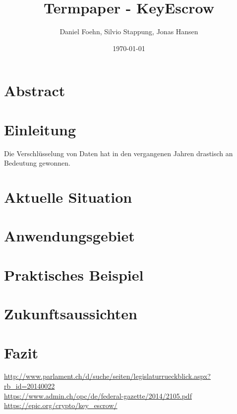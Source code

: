 \documentclass[a4paper, 10pt, fleqn]{article}
\title{Termpaper - KeyEscrow}
\author{Daniel Foehn, Silvio Stappung, Jonas Hansen}
\date{\today} %
\begin{document}
\maketitle
\tableofcontents
\listoffigures
\listoftables
\clearpage
\section{Abstract}

\clearpage
\section{Einleitung}
Die Verschlüsselung von Daten hat in den vergangenen Jahren drastisch an Bedeutung gewonnen. 


\clearpage
\section{Aktuelle Situation}
	

\clearpage
\section{Anwendungsgebiet}
	

\clearpage
\section{Praktisches Beispiel}
	 

\clearpage
\section{Zukunftsaussichten}

\clearpage
\section{Fazit}

\nocite{*}
\clearpage



\url{http://www.parlament.ch/d/suche/seiten/legislaturrueckblick.aspx?rb_id=20140022} \\ %
\url{https://www.admin.ch/opc/de/federal-gazette/2014/2105.pdf} \\ %
\url{https://epic.org/crypto/key_escrow/} %
\end{document}
